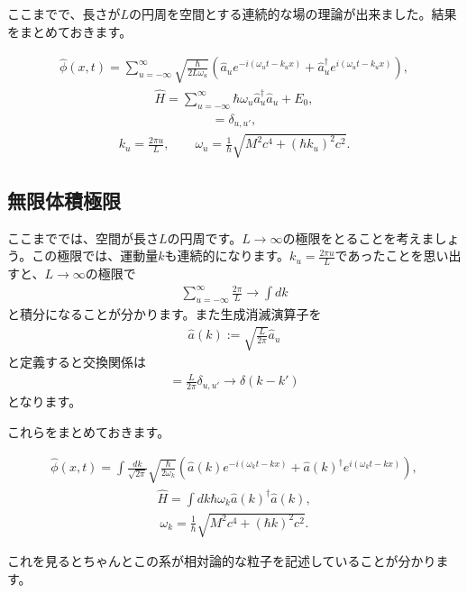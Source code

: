 \documentclass[report,paper=a4, fontsize=12pt, line_length=16cm, number_of_lines=33,dvipdfmx]{jlreq}
\newenvironment{important}{\begin{tcolorbox}[
  colback = white,
  colframe = red!35,
  boxrule = 2mm,
  fonttitle = \bfseries,
  after = \noindent] }{\end{tcolorbox}}
\numberwithin{equation}{chapter}
\newcommand{\phih}{\hat{\phi}}
\newcommand{\Hh}{\widehat{H}}
\newcommand{\ah}{\hat{a}}
\begin{document}
ここまでで、長さが$L$の円周を空間とする連続的な場の理論が出来ました。結果をまとめておきます。
\begin{important}
  \begin{align}
    \phih(x,t)=\sum_{u=-\infty}^{\infty}\sqrt{\frac{\hbar}{2L\omega_{u}}}(\ah_{u}e^{-i(\omega_ut-k_ux)}
    +\ah^{\dag}_{u}e^{i(\omega_ut-k_ux)}),
  \end{align}
  \begin{align}
    \Hh=\sum_{u=-\infty}^{\infty}\hbar \omega_{u}\ah_{u}^{\dag}\ah_{u}+E_0,
  \end{align}
  \begin{align}
    [\ah_{u},\ah_{u'}^{\dag}]=\delta_{u,u'},
  \end{align}
  \begin{align}
    k_u=\frac{2\pi u}{L},\qquad \omega_{u}=\frac{1}{\hbar}
    \sqrt{M^2c^4+(\hbar k_u)^2c^2}.
  \end{align}
\end{important}

\subsection{無限体積極限}
ここまででは、空間が長さ$L$の円周です。$L\to \infty$の極限をとることを考えましょう。この極限では、運動量$k$も連続的になります。$k_u=\frac{2\pi u}{L}$であったことを思い出すと、$L\to\infty$の極限で
\begin{align}
  \sum_{u=-\infty}^{\infty}\frac{2\pi}{L}\to \int dk
\end{align}
と積分になることが分かります。また生成消滅演算子を
\begin{align}
  \ah(k):=\sqrt{\frac{L}{2\pi}}\ah_{u}
\end{align}
と定義すると交換関係は
\begin{align}
  [\ah(k),\ah(k')^{\dag}]=\frac{L}{2\pi}\delta_{u,u'}\to \delta(k-k')
\end{align}
となります。

これらをまとめておきます。
\begin{important}
  \begin{align}
    \phih(x,t)=\int\frac{dk}{\sqrt{2\pi}}\sqrt{\frac{\hbar}{2\omega_k}}(\ah(k)e^{-i(\omega_{k}t-kx)} + \ah(k)^{\dag}e^{i(\omega_kt-kx)}),
  \end{align}
  \begin{align}
    \Hh=\int dk \hbar \omega_{k}\ah(k)^{\dag}\ah(k),
  \end{align}
  \begin{align}
    \omega_{k}=\frac{1}{\hbar}\sqrt{M^2c^4+(\hbar k)^2c^2}.
  \end{align}
\end{important}
これを見るとちゃんとこの系が相対論的な粒子を記述していることが分かります。
\end{document}
